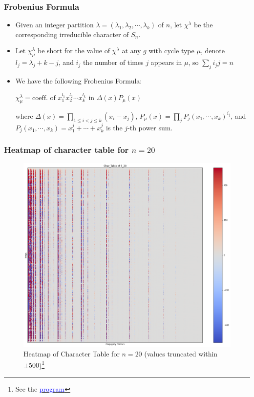\documentclass{beamer}
\begin{document}
\begin{frame}
\frametitle{Frobenius Formula}
\begin{theorem} 
    \begin{itemize}
\item Given an integer partition $\lambda = (\lambda_1, \lambda_2, \cdots,\lambda_k)$ of $n$, let $\chi^{\lambda}$ be the corresponding irreducible character of $S_n$. 
\item Let $\chi^{\lambda}_{\mu}$ be short for the value of $\chi^{\lambda}$ at any $g$ with cycle type $\mu$, denote $l_j  =\lambda_j + k - j$, and $i_j$ the number of times $j$ appears in $\mu$, so $\sum\limits_j i_jj = n$
\item We have the following Frobenius Formula: 

 $\chi^{\lambda}_{\mu} = \text{coeff. of }  x_{1}^{l_1} x_{2}^{l_2}\cdots x_{k}^{l_k}$ in $\Delta(x) P_{\mu}(x)$
 
  
where $\Delta(x) = \prod\limits_{1 \leq i < j \leq k} (x_i-x_j)$, $P_\mu(x) = \prod\limits_j P_j(x_1,\cdots, x_k)^{i_j}$, and $P_j(x_1,\cdots, x_k) = x_1^j + \cdots + x_k^j$ is the $j$-th power sum.
\end{itemize}
\end{theorem}
\end{frame}


\begin{frame}
\frametitle{Heatmap of character table for $n=20$}
\begin{figure}[H]
  \centering
  \includegraphics[width=0.6\linewidth]{char_table_20.png}
  \begin{center}
      \caption{\tiny Heatmap of Character Table for $n=20$ (values truncated within $\pm 500$)\footnote{ \tiny See the \href{https://github.com/TonyZhang2004/Character_Table_of_Symmetric_Groups/blob/main/char_table.ipynb}{\textcolor{blue}{program}}}}
  \end{center}
  
  \label{fig:char_20}
\end{figure}
\end{frame}
\end{document}
